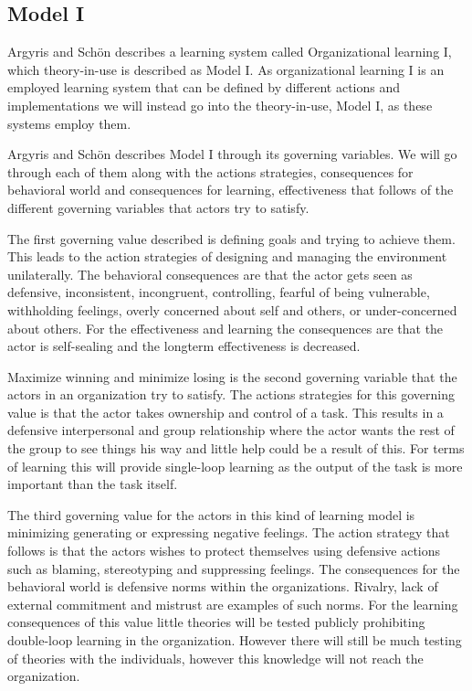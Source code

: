 \subsection{Model I} %
\label{sub:model_i}
Argyris and Schön \cite{Argyris1996} describes a learning system called Organizational learning I, which theory-in-use is described as Model I. As organizational learning I is an employed learning system that can be defined by different actions and implementations we will instead go into the theory-in-use, Model I, as these systems employ them.

Argyris and Schön \cite{Argyris1996} describes Model I through its governing variables. We will go through each of them along with the actions strategies, consequences for behavioral world and consequences for learning, effectiveness that follows of the different governing variables that actors try to satisfy. 

The first governing value described is defining goals and trying to achieve them. This leads to the action strategies of designing and managing the environment unilaterally. The behavioral consequences are that the actor gets seen as defensive, inconsistent, incongruent, controlling, fearful of being vulnerable, withholding feelings, overly concerned about self and others, or under-concerned about others. For the effectiveness and learning the consequences are that the actor is self-sealing and the longterm effectiveness is decreased. 

Maximize winning and minimize losing is the second governing variable that the actors in an organization try to satisfy. The actions strategies for this governing value is that the actor takes ownership and control of a task. This results in a defensive interpersonal and group relationship where the actor wants the rest of the group to see things his way and little help could be a result of this. For terms of learning this will provide single-loop learning as the output of the task is more important than the task itself. 

The third governing value for the actors in this kind of learning model is minimizing generating or expressing negative feelings. The action strategy that follows is that the actors wishes to protect themselves using defensive actions such as blaming, stereotyping and suppressing feelings. The consequences for the behavioral world is defensive norms within the organizations. Rivalry, lack of external commitment and mistrust are examples of such norms. For the learning consequences of this value little theories will be tested publicly prohibiting double-loop learning in the organization. However there will still be much testing of theories with the individuals, however this knowledge will not reach the organization. 

